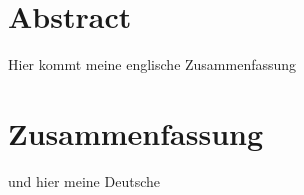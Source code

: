 \section{Abstract}

Hier kommt meine englische Zusammenfassung

\newpage
\section{Zusammenfassung}
und hier meine Deutsche
\newpage
